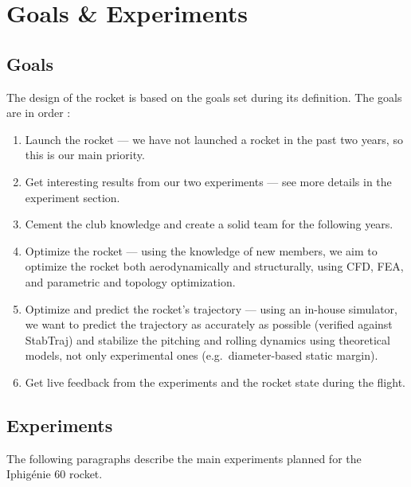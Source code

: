 \section{Goals \& Experiments}
\subsection{Goals}
The design of the rocket is based on the goals set during its definition. The goals are in order :
\begin{enumerate}
	\item Launch the rocket --- we have not launched a rocket in the past two years, so this is our main priority.
	\item Get interesting results from our two experiments --- see more details in the experiment section.
	\item Cement the club knowledge and create a solid team for the following years.
	\item Optimize the rocket --- using the knowledge of new members, we aim to optimize the rocket both aerodynamically and structurally, using CFD, FEA, and parametric and topology optimization.
	\item Optimize and predict the rocket's trajectory --- using an in-house simulator, we want to predict the trajectory as accurately as possible (verified against StabTraj) and stabilize the pitching and rolling dynamics using theoretical models, not only experimental ones (e.g.\ diameter-based static margin).
	\item Get live feedback from the experiments and the rocket state during the flight.
\end{enumerate}

\subsection{Experiments}
The following paragraphs describe the main experiments planned for the Iphigénie 60 rocket.

